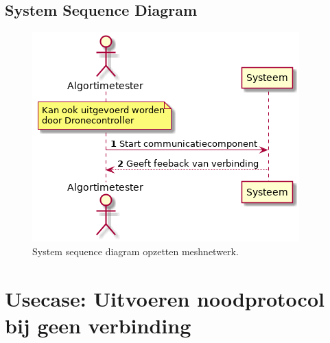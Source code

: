 \documentclass[a4paper, 11pt, oneside]{report}
\begin{document}

\label{Usecase:opbouwenmeshnetwerk:fully-dressed}
\subsection{System Sequence Diagram }
\label{Usecase:opbouwenmeshnetwerk:systemsequence}

\begin{figure}[H]
	\begin{center}\includegraphics[height=.2\textheight]{UML/out/usecase/sequence/meshnetwerk/meshnetwerk.png}\end{center}
	\caption{System sequence diagram opzetten meshnetwerk.}
	\label{fig:opbouwenmeshnetwerk:systemsequence}
\end{figure}


\hypertarget{noodprotocol}{\section[Uitvoeren noodprotocol bij geen verbinding]{Usecase: Uitvoeren noodprotocol bij geen verbinding}}
\label{Usecase:noodprotocol}
\end{document}
